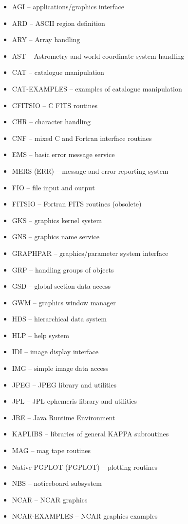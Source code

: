 \documentclass[twoside,11pt]{article}
\renewcommand{\_}{\texttt{\symbol{95}}}
\begin{document}
\begin{itemize}
\item AGI -- applications/graphics interface
\item ARD -- ASCII region definition
\item ARY -- Array handling
\item AST -- Astrometry and world coordinate system handling
\item CAT -- catalogue manipulation
\item CAT-EXAMPLES -- examples of catalogue manipulation
\item CFITSIO -- C FITS routines
\item CHR -- character handling
\item CNF -- mixed C and Fortran interface routines
\item EMS -- basic error message service
\item MERS (ERR) -- message and error reporting system
\item FIO -- file input and output
\item FITSIO -- Fortran FITS routines (obsolete)
\item GKS -- graphics kernel system
\item GNS -- graphics name service
\item GRAPHPAR -- graphics/parameter system interface
\item GRP -- handling groups of objects
\item GSD -- global section data access
\item GWM -- graphics window manager
\item HDS -- hierarchical data system
\item HLP -- help system
\item IDI -- image display interface
\item IMG -- simple image data access
\item JPEG -- JPEG library and utilities
\item JPL -- JPL ephemeris library and utilities
\item JRE -- Java Runtime Environment
\item KAPLIBS -- libraries of general KAPPA subroutines
\item MAG -- mag tape routines
\item Native-PGPLOT (PGPLOT) -- plotting routines
\item NBS -- noticeboard subsystem
\item NCAR -- NCAR graphics
\item NCAR-EXAMPLES -- NCAR graphics examples

\end{itemize}
\end{document}
